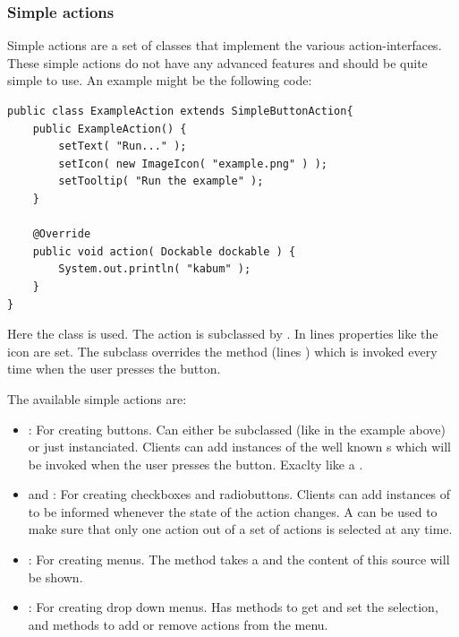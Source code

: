 \subsubsection{Simple actions}
Simple actions are a set of classes that implement the various action-interfaces. These simple actions do not have any advanced features and should be quite simple to use. An example might be the following code:

\begin{lstlisting}
public class ExampleAction extends SimpleButtonAction{
	public ExampleAction() {
		setText( "Run..." );
		setIcon( new ImageIcon( "example.png" ) );
		setTooltip( "Run the example" );
	}

	@Override
	public void action( Dockable dockable ) {
		System.out.println( "kabum" );
	}
}
\end{lstlisting}

Here the class  is used. The action is subclassed by . In lines  properties like the icon are set. The subclass overrides the method  (lines ) which is invoked every time when the user presses the button.

The available simple actions are:
\begin{itemize}
	\item {}: For creating buttons. Can either be subclassed (like in the example above) or just instanciated. Clients can add instances of the well known s which will be invoked when the user presses the button. Exaclty like a .
	\item {} and : \linebreak For creating checkboxes and radiobuttons. Clients can add instances of \linebreak {} to be informed whenever the state of the action changes. A  can be used to make sure that only one action out of a set of actions is selected at any time.
	\item {}: For creating menus. The method  takes a  and the content of this source will be shown.
	\item {}: For creating drop down menus. Has methods to get and set the selection, and methods to add or remove actions from the menu.
\end{itemize}

